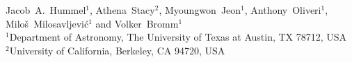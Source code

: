 
Jacob~A.~Hummel$^1$,
  Athena~Stacy$^2$, Myoungwon~Jeon$^1$, Anthony~Oliveri$^1$, 
\newauthor Milo\v s~Milosavljevi\'c$^1$ and Volker~Bromm$^1$\\
$^1$Department of Astronomy, The University of Texas at Austin, TX 78712, USA\\
$^2$University of California, Berkeley, CA 94720, USA
 

